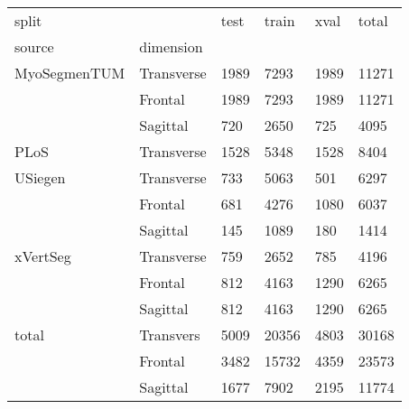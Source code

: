 \begin{tabular}{ll|lll|l}
    \toprule
    split        &            & test & train & xval & total \\
    source       & dimension  &      &       &      &       \\ \midrule
    MyoSegmenTUM & Transverse & 1989 & 7293  & 1989 & 11271 \\
                 & Frontal    & 1989 & 7293  & 1989 & 11271 \\
                 & Sagittal   & 720  & 2650  & 725  & 4095  \\
    PLoS         & Transverse & 1528 & 5348  & 1528 & 8404  \\
    USiegen      & Transverse & 733  & 5063  & 501  & 6297  \\
                 & Frontal    & 681  & 4276  & 1080 & 6037  \\
                 & Sagittal   & 145  & 1089  & 180  & 1414  \\
    xVertSeg     & Transverse & 759  & 2652  & 785  & 4196  \\
                 & Frontal    & 812  & 4163  & 1290 & 6265  \\
                 & Sagittal   & 812  & 4163  & 1290 & 6265  \\ \midrule
    total        & Transvers  & 5009 & 20356 & 4803 & 30168 \\
                 & Frontal    & 3482 & 15732 & 4359 & 23573 \\
                 & Sagittal   & 1677 & 7902  & 2195 & 11774 \\ \bottomrule
    \end{tabular}